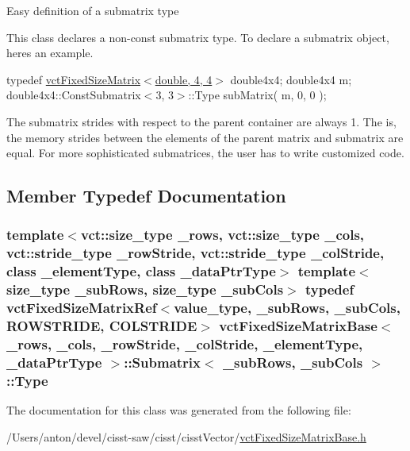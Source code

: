 Easy definition of a submatrix type

This class declares a non-\/const submatrix type. To declare a submatrix object, here\textquotesingle{}s an example.

typedef \hyperlink{classvct_fixed_size_matrix}{vct\+Fixed\+Size\+Matrix$<$double, 4, 4$>$} double4x4; double4x4 m; double4x4\+::\+Const\+Submatrix$<$3, 3$>$\+::\+Type sub\+Matrix( m, 0, 0 );

The submatrix strides with respect to the parent container are always 1. The is, the memory strides between the elements of the parent matrix and submatrix are equal. For more sophisticated submatrices, the user has to write customized code. 

\subsection{Member Typedef Documentation}
\hypertarget{classvct_fixed_size_matrix_base_1_1_submatrix_a0159859a38f45bd4a73c8202e573b6bd}{}
\subsubsection[{Type}]{\setlength{\rightskip}{0pt plus 5cm}template$<$vct\+::size\+\_\+type \+\_\+rows, vct\+::size\+\_\+type \+\_\+cols, vct\+::stride\+\_\+type \+\_\+row\+Stride, vct\+::stride\+\_\+type \+\_\+col\+Stride, class \+\_\+element\+Type, class \+\_\+data\+Ptr\+Type$>$ template$<$size\+\_\+type \+\_\+sub\+Rows, size\+\_\+type \+\_\+sub\+Cols$>$ typedef {\bf vct\+Fixed\+Size\+Matrix\+Ref}$<$value\+\_\+type, \+\_\+sub\+Rows, \+\_\+sub\+Cols, {\bf R\+O\+W\+S\+T\+R\+I\+D\+E}, {\bf C\+O\+L\+S\+T\+R\+I\+D\+E}$>$ {\bf vct\+Fixed\+Size\+Matrix\+Base}$<$ \+\_\+rows, \+\_\+cols, \+\_\+row\+Stride, \+\_\+col\+Stride, \+\_\+element\+Type, \+\_\+data\+Ptr\+Type $>$\+::{\bf Submatrix}$<$ \+\_\+sub\+Rows, \+\_\+sub\+Cols $>$\+::{\bf Type}}\label{classvct_fixed_size_matrix_base_1_1_submatrix_a0159859a38f45bd4a73c8202e573b6bd}


The documentation for this class was generated from the following file\+:\begin{DoxyCompactItemize}
\item 
/\+Users/anton/devel/cisst-\/saw/cisst/cisst\+Vector/\hyperlink{vct_fixed_size_matrix_base_8h}{vct\+Fixed\+Size\+Matrix\+Base.\+h}\end{DoxyCompactItemize}
